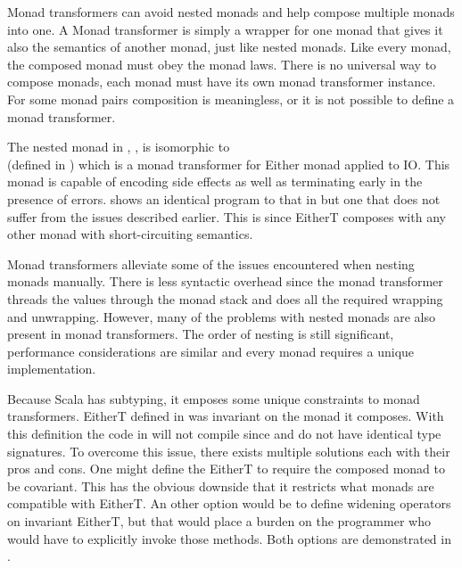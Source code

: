 


Monad transformers can avoid nested monads and help compose multiple monads into one. A Monad transformer is simply a wrapper for one monad that gives it also the semantics of another monad, just like nested monads. Like every monad, the composed monad must obey the monad laws. There is no universal way to compose monads, each monad must have its own monad transformer instance. For some monad pairs composition is meaningless, or it is not possible to define a monad transformer.

The nested monad in , , is isomorphic to \\ (defined in ) which is a monad transformer for Either monad applied to IO. This monad is capable of encoding side effects as well as terminating early in the presence of errors.  shows an identical program to that in  but one that does not suffer from the issues described earlier. This is since EitherT composes with any other monad with short-circuiting semantics.



Monad transformers alleviate some of the issues encountered when nesting monads manually. There is less syntactic overhead since the monad transformer threads the values through the monad stack and does all the required wrapping and unwrapping. However, many of the problems with nested monads are also present in monad transformers. The order of nesting is still significant, performance considerations are similar and every monad requires a unique implementation.

Because Scala has subtyping, it emposes some unique constraints to monad transformers. EitherT defined in  was invariant on the monad it composes. With this definition the code in  will not compile since  and  do not have identical type signatures. To overcome this issue, there exists multiple solutions each with their pros and cons. One might define the EitherT to require the composed monad to be covariant. This has the obvious downside that it restricts what monads are compatible with EitherT. An other option would be to define widening operators on invariant EitherT, but that would place a burden on the programmer who would have to explicitly invoke those methods. Both options are demonstrated in .

